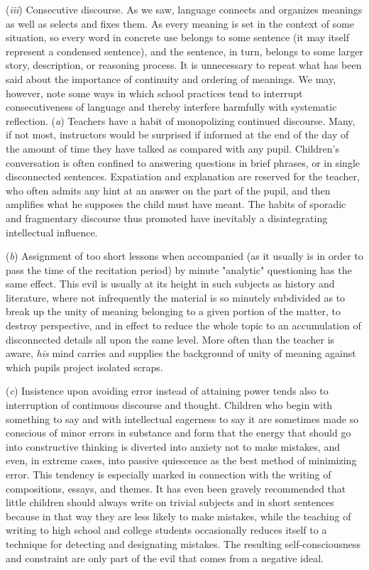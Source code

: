 \documentclass[letterpaper]{book}
\begin{document}

(\emph{iii}) Consecutive discourse. As we saw, language connects and
organizes meanings as well as selects and fixes them. As every meaning
is set in the context of some situation, so every word in concrete use
belongs to some sentence (it may itself represent a condensed sentence),
and the sentence, in turn, belongs to some larger story, description, or
reasoning process. It is unnecessary to repeat what has been said about
the importance of continuity and ordering of meanings. We may, however,
note some ways in which school practices tend to interrupt
consecutiveness of language and thereby interfere harmfully with
systematic reflection. (\emph{a}) Teachers have a habit of monopolizing
continued discourse. Many, if not most, instructors would be surprised
if informed at the end of the day of the amount of time they have talked
as compared with any pupil. Children's conversation is often confined to
answering questions in brief phrases, or in single disconnected
sentences.
Expatiation
and explanation are reserved for the teacher, who often admits any hint
at an answer on the part of the pupil, and then amplifies what he
supposes the child must have meant. The habits of sporadic and
fragmentary discourse thus promoted have inevitably a disintegrating
intellectual influence.


(\emph{b}) Assignment of too short lessons when accompanied (as it
usually is in order to pass the time of the recitation period) by minute
"analytic" questioning has the same effect. This evil is usually at its
height in such subjects as history and literature, where not
infrequently the material is so minutely subdivided as to break up the
unity of meaning belonging to a given portion of the matter, to destroy
perspective, and in effect to reduce the whole topic to an accumulation
of disconnected details all upon the same level. More often than the
teacher is aware, \emph{his} mind carries and supplies the background of
unity of meaning against which pupils project isolated scraps.


(\emph{c}) Insistence upon avoiding error instead of attaining power
tends also to interruption of continuous discourse and thought. Children
who begin with something to say and with intellectual eagerness to say
it are sometimes made so conscious of minor errors in substance and form
that the energy that should go into constructive thinking is diverted
into anxiety not to make mistakes, and even, in extreme cases, into
passive quiescence as the best method of minimizing error. This tendency
is especially marked in connection with the writing of compositions,
essays, and themes. It has even been gravely recommended that little
children should always write on trivial subjects and in short sentences
because in that way they are less likely to make mistakes,
while
the teaching of writing to high school and college students occasionally
reduces itself to a technique for detecting and designating mistakes.
The resulting self-consciousness and constraint are only part of the
evil that comes from a negative
ideal.
\end{document}
